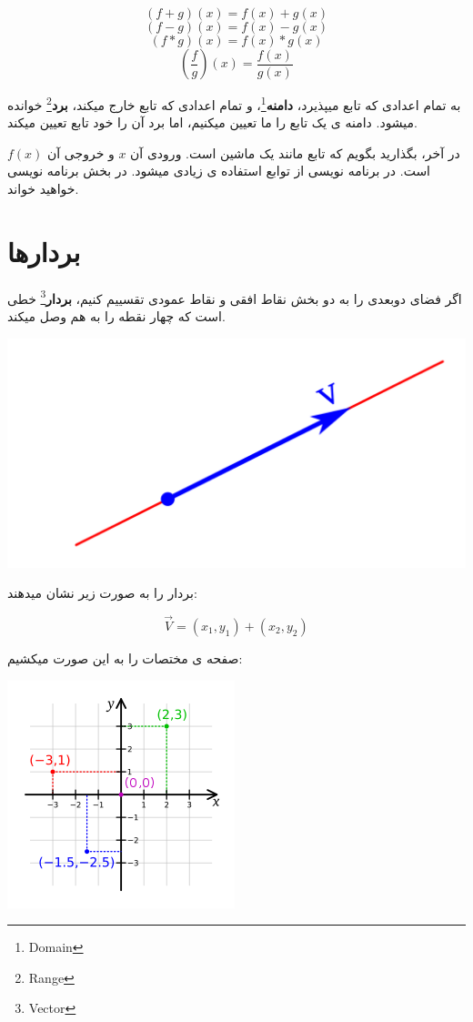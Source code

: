 \documentclass[14pt,a4paper]{memoir}
\begin{document}
\[ (f + g)(x) = f(x) + g(x) \]
\[ (f - g)(x) = f(x) - g(x) \]
\[ (f * g)(x) = f(x) * g(x) \]
\[ (\frac{f}{g})(x) = \frac{f(x)}{g(x)} \]

به تمام اعدادی که تابع میپذیرد، \textbf{دامنه}\footnote{Domain}، و تمام اعدادی که تابع خارج میکند، \textbf{برد}\footnote{Range} خوانده میشود. دامنه ی یک تابع را ما تعیین میکنیم، اما برد آن را خود تابع تعیین میکند.

در آخر، بگذارید بگویم که تابع مانند یک ماشین است. ورودی آن $ x $ و خروجی آن $ f(x) $ است. در برنامه نویسی از توابع استفاده ی زیادی میشود. در بخش برنامه نویسی خواهید خواند.

\section{بردارها}\label{vector}

اگر فضای دوبعدی را به دو بخش نقاط افقی و نقاط عمودی تقسییم کنیم، \textbf{بردار}\footnote{Vector} خطی است که چهار نقطه را به هم وصل میکند.

\includegraphics*[scale=0.3]{Vector} 

بردار را به صورت زیر نشان میدهند:

\[ \vec{V} = (x_1, y_1) + (x_2, y_2) \]
	 
	 صفحه ی مختصات را به این صورت میکشیم: \vfill
	 \begin{center}
	 	\includegraphics*[scale = 1]{coordinate_system}
	 \end{center}
	 
\end{document}
